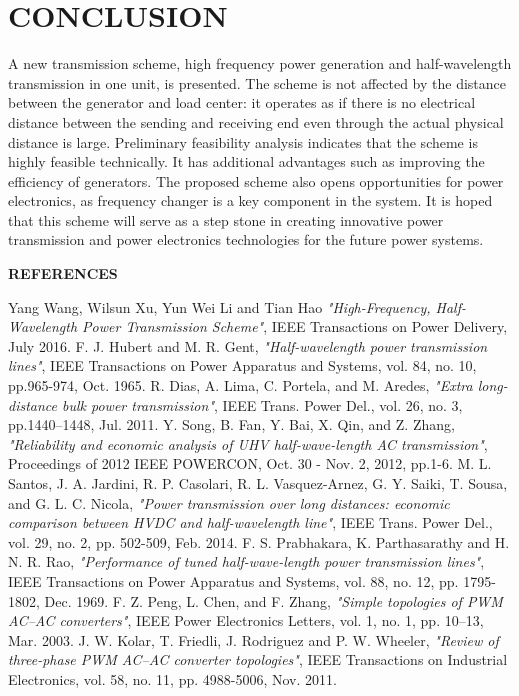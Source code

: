 \documentclass[12pt,a4paper]{reportmod}
\begin{document}
\chapter{CONCLUSION}
\par A new transmission scheme, high frequency power generation and half-wavelength transmission in one unit, is presented. The scheme is not affected by the distance between the generator and load center: it operates as if there is no electrical distance between the sending and receiving end even through the actual physical distance is large. Preliminary feasibility analysis indicates that the scheme is highly feasible technically. It has additional advantages such as improving the efficiency of generators. The proposed scheme also opens opportunities for power electronics, as frequency changer is a key component in the system. It is hoped that this scheme will serve as a step stone in creating innovative power transmission and power electronics technologies for the future power systems.

\newpage
{}
\thispagestyle{empty}%
\begin{center}
\begin{large}
\textbf{REFERENCES}
\end{large}
\end{center}
\begin{thebibliography}{}
\bibitem{}Yang Wang, Wilsun Xu, Yun Wei Li and Tian Hao \emph{"High-Frequency, Half-Wavelength Power Transmission Scheme"}, IEEE Transactions on Power Delivery, July 2016.
\bibitem{}F. J. Hubert and M. R. Gent, \emph{"Half-wavelength power transmission lines"}, IEEE Transactions on Power Apparatus and Systems, vol. 84, no. 10, pp.965-974, Oct. 1965.
\bibitem{}R. Dias, A. Lima, C. Portela, and M. Aredes, \emph{"Extra long-distance bulk power transmission"}, IEEE Trans. Power Del., vol. 26, no. 3, pp.1440–1448, Jul. 2011.
\bibitem{}Y. Song, B. Fan, Y. Bai, X. Qin, and Z. Zhang, \emph{"Reliability and economic analysis of UHV half-wave-length AC transmission"}, Proceedings of 2012 IEEE POWERCON, Oct. 30 - Nov. 2, 2012, pp.1-6.
\bibitem{}M. L. Santos, J. A. Jardini, R. P. Casolari, R. L. Vasquez-Arnez, G. Y. Saiki, T. Sousa, and G. L. C. Nicola, \emph{"Power transmission over long distances: economic comparison between HVDC and half-wavelength line"}, IEEE Trans. Power Del., vol. 29, no. 2, pp. 502-509, Feb. 2014.
\bibitem{}F. S. Prabhakara, K. Parthasarathy and H. N. R. Rao, \emph{"Performance of tuned half-wave-length power transmission lines"}, IEEE Transactions on Power Apparatus and Systems, vol. 88, no. 12, pp. 1795-1802, Dec. 1969.
\bibitem{}F. Z. Peng, L. Chen, and F. Zhang, \emph{"Simple topologies of PWM AC–AC converters"}, IEEE Power Electronics Letters, vol. 1, no. 1, pp. 10–13, Mar. 2003.
\bibitem{}J. W. Kolar, T. Friedli, J. Rodriguez and P. W. Wheeler, \emph{"Review of three-phase PWM AC–AC converter topologies"}, IEEE Transactions on Industrial Electronics, vol. 58, no. 11, pp. 4988-5006, Nov. 2011.
\end{thebibliography}
\end{document}
